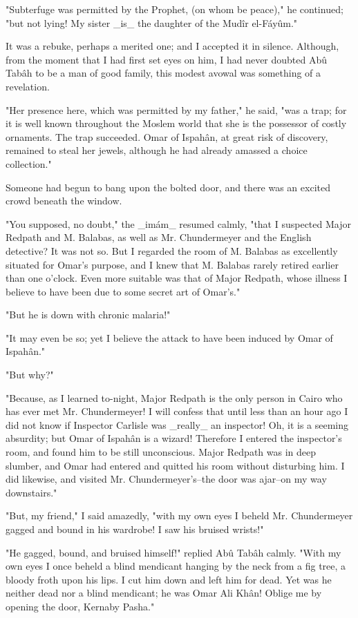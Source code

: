 "Subterfuge was permitted by the Prophet, (on whom be peace)," he
continued; "but not lying! My sister _is_ the daughter of the Mudîr
el-Fáyûm."

It was a rebuke, perhaps a merited one; and I accepted it in silence.
Although, from the moment that I had first set eyes on him, I had
never doubted Abû Tabâh to be a man of good family, this modest avowal
was something of a revelation.

"Her presence here, which was permitted by my father," he said, "was a
trap; for it is well known throughout the Moslem world that she is the
possessor of costly ornaments. The trap succeeded. Omar of Ispahân, at
great risk of discovery, remained to steal her jewels, although he had
already amassed a choice collection."

Someone had begun to bang upon the bolted door, and there was an
excited crowd beneath the window.

"You supposed, no doubt," the _imám_ resumed calmly, "that I suspected
Major Redpath and M. Balabas, as well as Mr. Chundermeyer and the
English detective? It was not so. But I regarded the room of M.
Balabas as excellently situated for Omar's purpose, and I knew that M.
Balabas rarely retired earlier than one o'clock. Even more suitable
was that of Major Redpath, whose illness I believe to have been due to
some secret art of Omar's."

"But he is down with chronic malaria!"

"It may even be so; yet I believe the attack to have been induced by
Omar of Ispahân."

"But why?"

"Because, as I learned to-night, Major Redpath is the only person in
Cairo who has ever met Mr. Chundermeyer! I will confess that until
less than an hour ago I did not know if Inspector Carlisle was
_really_ an inspector! Oh, it is a seeming absurdity; but Omar of
Ispahân is a wizard! Therefore I entered the inspector's room, and
found him to be still unconscious. Major Redpath was in deep slumber,
and Omar had entered and quitted his room without disturbing him. I
did likewise, and visited Mr. Chundermeyer's--the door was ajar--on
my way downstairs."

"But, my friend," I said amazedly, "with my own eyes I beheld Mr.
Chundermeyer gagged and bound in his wardrobe! I saw his bruised
wrists!"

"He gagged, bound, and bruised himself!" replied Abû Tabâh calmly.
"With my own eyes I once beheld a blind mendicant hanging by the neck
from a fig tree, a bloody froth upon his lips. I cut him down and left
him for dead. Yet was he neither dead nor a blind mendicant; he was
Omar Ali Khân! Oblige me by opening the door, Kernaby Pasha."

